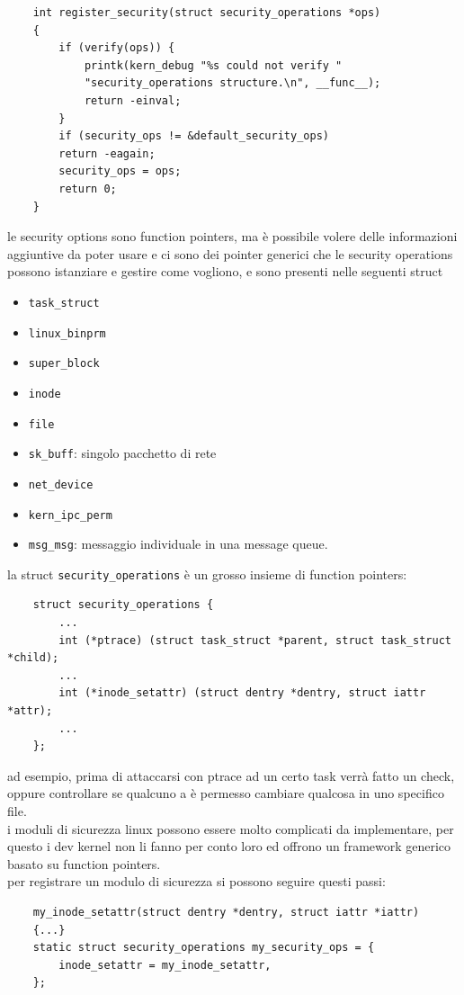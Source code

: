 \documentclass[12pt, oneside]{extbook} %
\begin{document}
\begin{lstlisting}
	int register_security(struct security_operations *ops)
	{
		if (verify(ops)) {
			printk(kern_debug "%s could not verify "
			"security_operations structure.\n", __func__);
			return -einval;
		}
		if (security_ops != &default_security_ops)
		return -eagain;
		security_ops = ops;
		return 0;
	}
\end{lstlisting}
le security options sono function pointers, ma è possibile volere delle informazioni aggiuntive da poter usare e ci sono dei pointer generici che le security operations possono istanziare e gestire come vogliono, e sono presenti nelle seguenti struct
\begin{itemize}
\item \texttt{task\_struct}
\item \texttt{linux\_binprm}
\item \texttt{super\_block}
\item \texttt{inode}
\item \texttt{file}
\item \texttt{sk\_buff}: singolo pacchetto di rete
\item \texttt{net\_device}
\item \texttt{kern\_ipc\_perm}
\item \texttt{msg\_msg}: messaggio individuale in una message queue.
\end{itemize}
la struct \texttt{security\_operations} è un grosso insieme di function pointers:
\begin{lstlisting}
	struct security_operations {
		...
		int (*ptrace) (struct task_struct *parent, struct task_struct *child);
		...
		int (*inode_setattr) (struct dentry *dentry, struct iattr *attr);
		...
	};
\end{lstlisting}
ad esempio, prima di attaccarsi con ptrace ad un certo task verrà fatto un check, oppure controllare se qualcuno a è permesso cambiare qualcosa in uno specifico file.\\i moduli di sicurezza linux possono essere molto complicati da implementare, per questo i dev kernel non li fanno per conto loro ed offrono un framework generico basato su function pointers.\\per registrare un modulo di sicurezza si possono seguire questi passi:
\begin{lstlisting}
	my_inode_setattr(struct dentry *dentry, struct iattr *iattr)
	{...}
	static struct security_operations my_security_ops = {
		inode_setattr = my_inode_setattr,
	};
\end{lstlisting}
\end{document}
